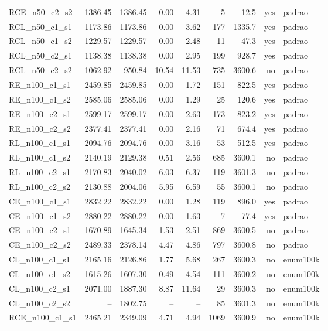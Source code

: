 \begin{tabular}{lrrrrrrrl}
RCE\_n50\_c2\_s2 & 1386.45 & 1386.45 & 0.00 & 4.31 & 5 & 12.5 & yes & padrao \\
RCL\_n50\_c1\_s1 & 1173.86 & 1173.86 & 0.00 & 3.62 & 177 & 1335.7 & yes & padrao \\
RCL\_n50\_c1\_s2 & 1229.57 & 1229.57 & 0.00 & 2.48 & 11 & 47.3 & yes & padrao \\
RCL\_n50\_c2\_s1 & 1138.38 & 1138.38 & 0.00 & 2.95 & 199 & 928.7 & yes & padrao \\
RCL\_n50\_c2\_s2 & 1062.92 & 950.84 & 10.54 & 11.53 & 735 & 3600.6 & no & padrao \\
\midrule
RE\_n100\_c1\_s1 & 2459.85 & 2459.85 & 0.00 & 1.72 & 151 & 822.5 & yes & padrao \\
RE\_n100\_c1\_s2 & 2585.06 & 2585.06 & 0.00 & 1.29 & 25 & 120.6 & yes & padrao \\
RE\_n100\_c2\_s1 & 2599.17 & 2599.17 & 0.00 & 2.63 & 173 & 823.2 & yes & padrao \\
RE\_n100\_c2\_s2 & 2377.41 & 2377.41 & 0.00 & 2.16 & 71 & 674.4 & yes & padrao \\
RL\_n100\_c1\_s1 & 2094.76 & 2094.76 & 0.00 & 3.16 & 53 & 512.5 & yes & padrao \\
RL\_n100\_c1\_s2 & 2140.19 & 2129.38 & 0.51 & 2.56 & 685 & 3600.1 & no & padrao \\
RL\_n100\_c2\_s1 & 2170.83 & 2040.02 & 6.03 & 6.37 & 119 & 3601.3 & no & padrao \\
RL\_n100\_c2\_s2 & 2130.88 & 2004.06 & 5.95 & 6.59 & 55 & 3600.1 & no & padrao \\
CE\_n100\_c1\_s1 & 2832.22 & 2832.22 & 0.00 & 1.28 & 119 & 896.0 & yes & padrao \\
CE\_n100\_c1\_s2 & 2880.22 & 2880.22 & 0.00 & 1.63 & 7 & 77.4 & yes & padrao \\
CE\_n100\_c2\_s1 & 1670.89 & 1645.34 & 1.53 & 2.51 & 869 & 3600.5 & no & padrao \\
CE\_n100\_c2\_s2 & 2489.33 & 2378.14 & 4.47 & 4.86 & 797 & 3600.8 & no & padrao \\
CL\_n100\_c1\_s1 & 2165.16 & 2126.86 & 1.77 & 5.68 & 267 & 3600.3 & no & enum100k \\
CL\_n100\_c1\_s2 & 1615.26 & 1607.30 & 0.49 & 4.54 & 111 & 3600.2 & no & enum100k \\
CL\_n100\_c2\_s1 & 2071.00 & 1887.30 & 8.87 & 11.64 & 29 & 3600.3 & no & enum100k \\
CL\_n100\_c2\_s2 & -- & 1802.75 & -- & -- & 85 & 3601.3 & no & enum100k \\
RCE\_n100\_c1\_s1 & 2465.21 & 2349.09 & 4.71 & 4.94 & 1069 & 3600.9 & no & enum100k \\

\end{tabular}
